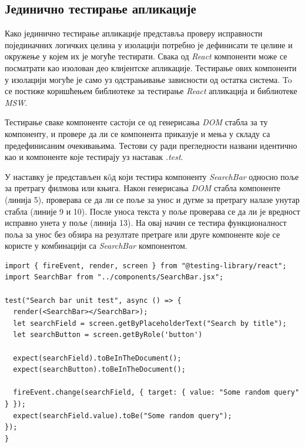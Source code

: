\documentclass[12pt,oneside]{memoir}
\begin{document}
\subsection{Јединично тестирање апликације}

Како јединично тестирање апликације представља проверу исправности појединачних логичких целина у изолацији потребно је дефинисати те целине и окружење у којем их је могуће тестирати. Свака од \textit{React} компоненти може се посматрати као изолован део клијентске апликације. Тестирање ових компоненти у изолацији могуће је само уз одстрањивање зависности од остатка система. To се постиже коришћењем библиотеке за тестирање \textit{React} апликација и библиотеке \textit{MSW}.

Тестирање сваке компоненте састоји се од генерисања \textit{DOM} стабла за ту компоненту, и провере да ли се компонента приказује и мења у складу са предефинисаним очекивањима. Тестови су ради прегледности названи идентично као и компоненте које тестирају уз наставак \textit{.test}. 

У наставку је представљен  к\^{o}д који тестира компоненту \textit{SearchBar} односно поље за претрагу филмова или књига. Након генерисања \textit{DOM} стабла компоненте (линија 5), проверава се да ли се поље за унос и дугме за претрагу налазе унутар стабла (линије 9 и 10). После уноса текста у поље проверава се да ли је вредност исправно унета у поље (линија 13). На овај начин се тестира функционалност поља за унос без обзира на резултате претраге или друге компоненте које се користе у комбинацији са \textit{SearchBar} компонентом.

\newpage

\begin{lstlisting}[caption=Јединично тестирање \textit{SearchBar} компоненте,
label={lst:searchbarTest},
frame=single]
import { fireEvent, render, screen } from "@testing-library/react";
import SearchBar from "../components/SearchBar.jsx";

test("Search bar unit test", async () => {
  render(<SearchBar></SearchBar>);
  let searchField = screen.getByPlaceholderText("Search by title");
  let searchButton = screen.getByRole('button')
  
  expect(searchField).toBeInTheDocument();
  expect(searchButton).toBeInTheDocument();

  fireEvent.change(searchField, { target: { value: "Some random query" } });
  expect(searchField.value).toBe("Some random query");
});
}
\end{lstlisting}
\end{document}
